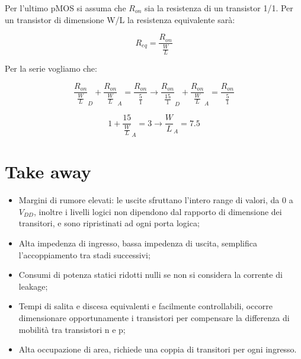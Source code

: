 \newpage
Per l'ultimo pMOS si assuma che $R_{on}$ sia la resistenza di un transistor 1/1. Per	un	transistor	di	dimensione W/L	la	
resistenza equivalente sarà:

\begin{equation*}
    R_{eq} = \frac{R_{on}}{\frac{W}{L}}
\end{equation*}

Per la serie vogliamo che:

\begin{equation*}
    \frac{R_{on}}{\frac{W}{L}}_D + \frac{R_{on}}{\frac{W}{L}}_A = \frac{R_{on}}{\frac{5}{1}} \to \frac{R_{on}}{\frac{15}{1}}_D + \frac{R_{on}}{\frac{W}{L}}_A = \frac{R_{on}}{\frac{5}{1}}
\end{equation*}

\begin{equation*}
    1+ \frac{15}{\frac{W}{L}}_A = 3 \to \frac{W}{L}_A = 7.5
\end{equation*}


\section{Take away}

\begin{itemize}
    \item Margini di	rumore elevati: le	uscite	sfruttano	l'intero	range	di	valori,	da	0	a	$V_{DD}$, inoltre i	livelli	 logici	non	dipendono	dal	rapporto	di	dimensione	dei	transitori,	e	sono	ripristinati	ad	ogni	porta	logica;
    \item Alta	impedenza	di	ingresso,	bassa	impedenza	di	uscita, semplifica	l'accoppiamento	tra	stadi	successivi;
    \item Consumi di	potenza statici ridotti nulli se	non	si considera la	corrente di	leakage;
    \item Tempi	di	salita e	discesa equivalenti e	facilmente controllabili, occorre dimensionare opportunamente i	transistori per	compensare la	 differenza di	mobilità	tra	transistori	n e	p;
    \item Alta	occupazione	di	area,  richiede	una	coppia	di	transitori	per	ogni	ingresso.
\end{itemize}

